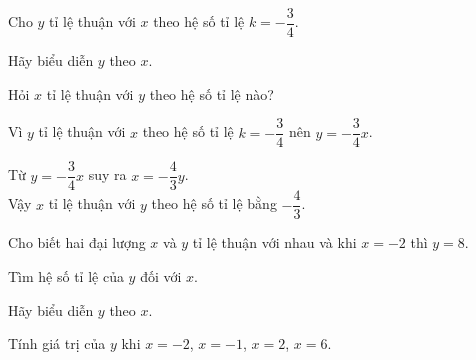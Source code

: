 \begin{bt}%
 Cho $y$ tỉ lệ thuận với $x$ theo hệ số tỉ lệ $k=-\dfrac{3}{4}$.
 \begin{enumEX}{2}
  \item Hãy biểu diễn $y$ theo $x$.
  \item Hỏi $x$ tỉ lệ thuận với $y$ theo hệ số tỉ lệ nào?
 \end{enumEX}
 \loigiai
  {
  \begin{listEX}
   \item Vì $y$ tỉ lệ thuận với $x$ theo hệ số tỉ lệ $k=-\dfrac{3}{4}$ nên $y=-\dfrac{3}{4}x$.
   \item Từ $y=-\dfrac{3}{4}x$ suy ra $x=-\dfrac{4}{3}y$.\\
   Vậy $x$ tỉ lệ thuận với $y$ theo hệ số tỉ lệ bằng $-\dfrac{4}{3}$.
  \end{listEX}
  }
\end{bt}

\begin{bt}%
 Cho biết hai đại lượng $x$ và $y$ tỉ lệ thuận với nhau và khi $x=-2$ thì $y=8$.
 \begin{listEX}
  \item Tìm hệ số tỉ lệ của $y$ đối với $x$.
  \item Hãy biểu diễn $y$ theo $x$.
  \item Tính giá trị của $y$ khi $x=-2$, $x=-1$, $x=2$, $x=6$.
 \end{listEX}
 \loigiai
  {
  }
\end{bt}

